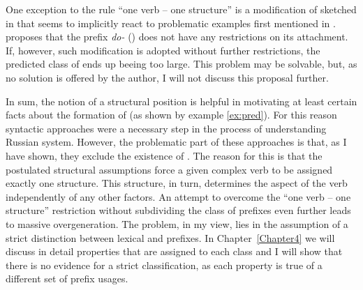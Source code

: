 One exception to the rule ``one verb -- one structure'' is a modification of \citet{Tatevosov:09} sketched in \citet{Tatevosov:13} that seems to implicitly react to problematic examples first mentioned in \citet{Zinova:12}. \citet{Tatevosov:13} proposes that the  prefix \textit{do-} () does not have any restrictions on its attachment. If, however, such modification is adopted without further restrictions, the predicted class of  ends up beeing too large. This problem may be solvable, but, as no solution is offered by the author, I will not discuss this proposal further.

%
In sum, the notion of a structural position is helpful in motivating at least certain facts about the formation of  (as shown by example \ref{ex:pred}). For this reason syntactic approaches were a necessary step in the process of understanding Russian  system. However, the problematic part of these approaches is that, as I have shown, they exclude the existence of . The reason for this is that the postulated structural assumptions force a given complex verb to be assigned exactly one structure. This structure, in turn, determines the aspect of the verb independently of any other factors. An attempt to overcome the ``one verb -- one structure'' restriction without subdividing the class of  prefixes even further  \citep{Tatevosov:13} leads to massive overgeneration. The problem, in my view, lies in the assumption of a strict distinction between lexical and  prefixes. In Chapter~\ref{Chapter4} we will discuss in detail properties that are assigned to each class and I will show that there is no evidence for a strict classification, as each property is true of a different set of prefix usages.

